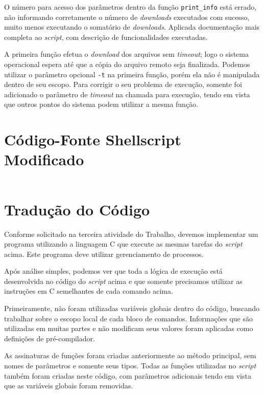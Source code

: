 \documentclass{article}
\begin{document}
O número para acesso dos parâmetros dentro da função \texttt{print\_info} está
errado, não informando corretamente o número de \textit{downloads} executados
com sucesso, muito menos executando o somatório de \textit{downloads}. Aplicada
documentação mais completa ao \textit{script}, com descrição de funcionalidades
executadas.

A primeira função efetua o \textit{download} dos arquivos sem \textit{timeout};
logo o sistema operacional espera até que a cópia do arquivo remoto seja
finalizada. Podemos utilizar o parâmetro opcional \texttt{-t} na primeira
função, porém ela não é manipulada dentro de seu escopo. Para corrigir o seu
problema de execução, somente foi adicionado o parâmetro de \textit{timeout} na
chamada para execução, tendo em vista que outros pontos do sistema podem
utilizar a mesma função.

\section{Código-Fonte Shellscript Modificado}

\begin{small}
\begin{verbatim}

\end{verbatim}
\end{small}

\section{Tradução do Código}

Conforme solicitado na terceira atividade do Trabalho, devemos implementar um
programa utilizando a linguagem C que execute as mesmas tarefas do
\textit{script} acima. Este programa deve utilizar gerenciamento de processos.

Após análise simples, podemos ver que toda a lógica de execução está
desenvolvida no código do \textit{script} acima e que somente precisamos
utilizar as instruções em C semelhantes de cada comando acima.

Primeiramente, não foram utilizadas variáveis globais dentro do código,
buscando trabalhar sobre o escopo local de cada bloco de comandos. Informações
que são utilizadas em muitas partes e não modificam seus valores foram aplicadas
como definições de pré-compilador.

As assinaturas de funções foram criadas anteriormente ao método principal, sem
nomes de parâmetros e somente seus tipos. Todas as funções utilizadas no
\textit{script} também foram criadas neste código, com parâmetros adicionais
tendo em vista que as variáveis globais foram removidas.
\end{document}
